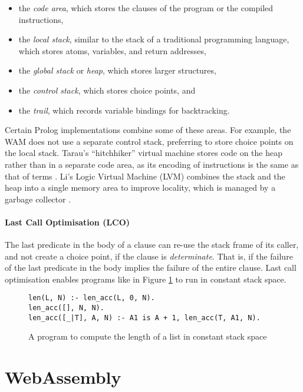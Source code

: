\begin{itemize}
\item the \emph{code area}, which stores the clauses of the program or the compiled instructions,
\item the \emph{local stack}, similar to the stack of a traditional programming language, which stores atoms, variables, and return addresses,
\item the \emph{global stack} or \emph{heap}, which stores larger structures,
\item the \emph{control stack}, which stores choice points, and
\item the \emph{trail}, which records variable bindings for backtracking.
\end{itemize}

Certain Prolog implementations combine some of these areas. For example, the WAM does not use a separate control stack, preferring to store choice points on the local stack. Tarau's ``hitchhiker'' virtual machine stores code on the heap rather than in a separate code area, as its encoding of instructions is the same as that of terms \cite{tarauHitchhikersGuideReinventing2018}. Li's Logic Virtual Machine (LVM) combines the stack and the heap into a single memory area to improve locality, which is managed by a garbage collector \cite{liEfficientMemoryManagement2000}.

\paragraph{Last Call Optimisation (LCO)} The last predicate in the body of a clause can re-use the stack frame of its caller, and not create a choice point, if the clause is \emph{determinate}. That is, if the failure of the last predicate in the body implies the failure of the entire clause. Last call optimisation enables programs like in Figure \ref{fig:lco} to run in constant stack space.

\begin{figure}[H]
\begin{center}
\begin{verbatim}
len(L, N) :- len_acc(L, 0, N).
len_acc([], N, N).
len_acc([_|T], A, N) :- A1 is A + 1, len_acc(T, A1, N).
\end{verbatim}
\end{center}
\caption{A program to compute the length of a list in constant stack space}
\label{fig:lco}
\end{figure}

\section{WebAssembly}

